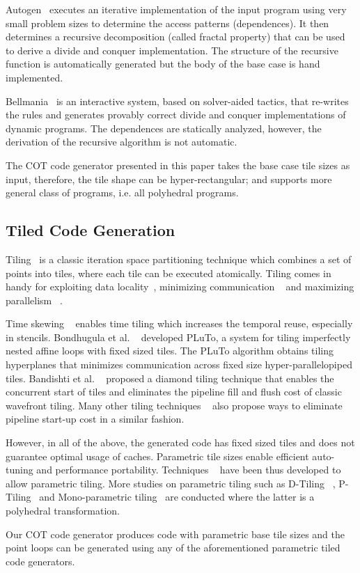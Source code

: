 Autogen~\cite{autogen-ppopp16} executes an iterative implementation of the input program using very small problem sizes to determine the access patterns (dependences).  It then determines a recursive decomposition (called fractal property) that can be used to derive a divide and conquer implementation. The structure of the recursive function is automatically generated but the body of the base case is hand implemented.  

Bellmania~\cite{itzhaky-oopsla2016} is an interactive system, based on solver-aided tactics, that re-writes the rules and generates provably correct divide and conquer implementations of dynamic programs.  The dependences are statically analyzed, however, the derivation of the recursive algorithm is not automatic.

The COT code generator presented in this paper takes the base case tile sizes as input, therefore, the tile shape can be hyper-rectangular; and supports more general class of programs, i.e. all polyhedral programs.

\subsection{Tiled Code Generation}
Tiling~\cite{Wol87,irigoin-popl88} is a classic iteration space partitioning technique which combines a set of points into tiles, where each tile can be executed atomically.  Tiling comes in handy for exploiting data locality~\cite{Wolf91tiling, kamil2010, liu2009}, minimizing communication ~\cite{Andonov2001,xue-jpdc97} and maximizing parallelism ~\citep{Bandishti12}.  

Time skewing ~\cite{wonnacott-time-skewing-tr99a} enables time tiling which increases the temporal reuse, especially in stencils.  Bondhugula et al. ~\cite{uday-pldi08} developed PLuTo, a system for tiling imperfectly nested affine loops with fixed sized tiles.  The PLuTo algorithm obtains tiling hyperplanes that minimizes communication across fixed size hyper-parallelopiped tiles. Bandishti et al. ~\cite{Bandishti12} proposed a diamond tiling technique that enables the concurrent start of tiles and eliminates the pipeline fill and flush cost of classic wavefront tiling. Many other tiling techniques ~\cite{Hartono-DynTile, grosser2014hybrid, TJin-Hybrid-Tech, Krishnamoorthy07, Henretty2013SIMDStencil, Holewinski2012Overtile} also propose ways to eliminate pipeline start-up cost in a similar fashion.  

However, in all of the above, the generated code has fixed sized tiles and does not guarantee optimal usage of caches.  Parametric tile sizes enable efficient auto-tuning and performance portability. Techniques ~\cite{Hartono2009prime, baskaran-etal-cgo10, Kim2010, lakshmi-thesis, sanjay-kim-dtilingTR-2010, darte2014parametric}  have been thus developed to allow parametric tiling. More studies on parametric tiling such as D-Tiling ~\cite{sanjay-lcpc2009, sanjay-kim-dtilingTR-2010}, P-Tiling~\cite{baskaran-etal-cgo10} and Mono-parametric tiling~\cite{iooss:hal2015} are conducted where the latter is a polyhedral transformation.  

Our COT code generator produces code with parametric base tile sizes and the point loops can be generated using any of the aforementioned parametric tiled code generators.



